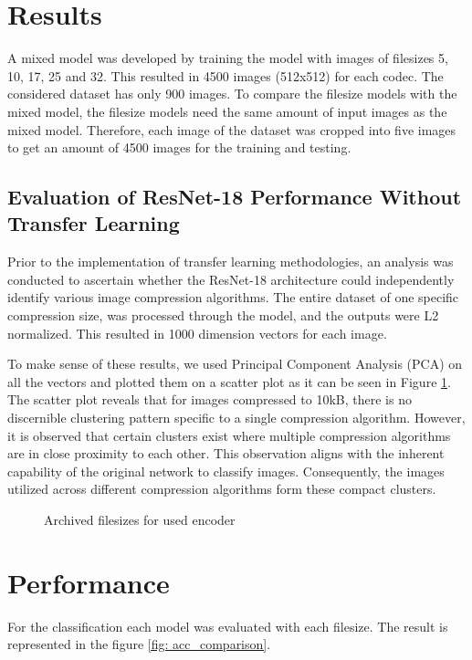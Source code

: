 \section{Results}
\label{Results}
A mixed model was developed by training the model with images of filesizes 5, 10, 17, 25 and 32. This resulted in 4500 images (512x512) for each codec. The considered dataset has only 900 images. To compare the filesize models with the mixed model, the filesize models need the same amount of input images as the mixed model. Therefore, each image of the dataset was cropped into five images to get an amount of 4500 images for the training and testing.

\subsection{Evaluation of ResNet-18 Performance Without Transfer Learning} 
Prior to the implementation of transfer learning methodologies, an analysis was conducted to ascertain whether the ResNet-18 architecture could independently identify various image compression algorithms. The entire dataset of one specific compression size, was processed through the model, and the outputs were L2 normalized. This resulted in 1000 dimension vectors for each image.

To make sense of these results, we used Principal Component Analysis (PCA) on all the vectors and plotted them on a scatter plot as it can be seen in Figure \ref{fig: no_transfer}. The scatter plot reveals that for images compressed to 10kB, there is no discernible clustering pattern specific to a single compression algorithm. However, it is observed that certain clusters exist where multiple compression algorithms are in close proximity to each other. This observation aligns with the inherent capability of the original network to classify images. Consequently, the images utilized across different compression algorithms form these compact clusters.

\begin{figure}[h!]
	\centering
	\resizebox{\textwidth}{!}{}
    \caption{Archived filesizes for used encoder}
	\label{fig: no_transfer}
\end{figure}

\section{Performance}
For the classification each model was evaluated with each filesize. The result is represented in the figure \ref{fig: acc_comparison}.

